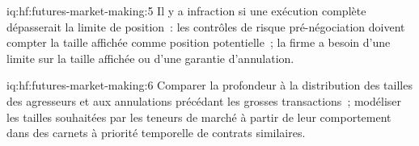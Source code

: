 \begin{solution}{iq:hf:futures-market-making:5}
Il y a infraction si une exécution complète dépasserait la limite de position~: les contrôles de risque pré-négociation doivent compter la taille affichée comme position potentielle~; la firme a besoin d'une
limite sur la taille affichée ou d'une garantie d'annulation.
\end{solution}

\begin{solution}{iq:hf:futures-market-making:6}
Comparer la profondeur à la distribution des tailles des agresseurs et aux annulations précédant les grosses transactions~; modéliser les tailles souhaitées par les teneurs de marché à partir de leur
comportement dans des carnets à priorité temporelle de contrats similaires.
\end{solution}
